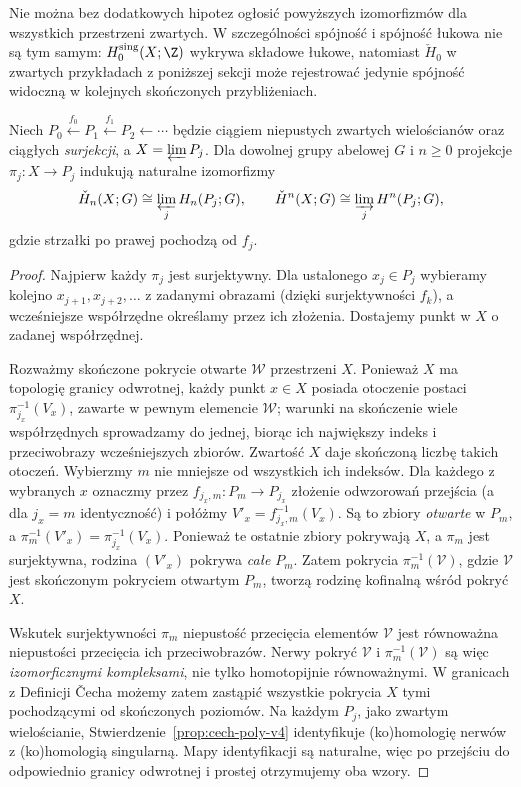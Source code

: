 \begin{uwaga}
Nie można bez dodatkowych hipotez ogłosić powyższych
izomorfizmów dla wszystkich przestrzeni zwartych.
W szczególności spójność i spójność łukowa nie są tym samym:
$H_0^{\mathrm{sing}}(X;\Z)$ wykrywa składowe łukowe,
natomiast $\check H_0$ w zwartych przykładach z poniższej
sekcji może rejestrować jedynie spójność widoczną w
kolejnych skończonych przybliżeniach.
\end{uwaga}

\begin{lemat}
\label{lem:cech-ciaglosc-odwrotna}
Niech $P_0\xleftarrow{f_0}P_1\xleftarrow{f_1}P_2
\xleftarrow{}\cdots$ będzie ciągiem niepustych
zwartych wielościanów oraz ciągłych \emph{surjekcji},
a $X=\varprojlim P_j$. Dla dowolnej grupy abelowej
$G$ i $n\ge0$ projekcje $\pi_j:X\to P_j$ indukują
naturalne izomorfizmy
\[
 \check H_n(X;G)\cong
 \varprojlim_j H_n(P_j;G),\qquad
 \check H^n(X;G)\cong
 \varinjlim_j H^n(P_j;G),
\]
gdzie strzałki po prawej pochodzą od $f_j$.
\end{lemat}
\begin{proof}
Najpierw każdy $\pi_j$ jest surjektywny.
Dla ustalonego $x_j\in P_j$ wybieramy kolejno
$x_{j+1},x_{j+2},\ldots$ z zadanymi obrazami
(dzięki surjektywności $f_k$), a wcześniejsze
współrzędne określamy przez ich złożenia.
Dostajemy punkt w $X$ o zadanej współrzędnej.

Rozważmy skończone pokrycie otwarte
$\mathcal W$ przestrzeni $X$. Ponieważ $X$
ma topologię granicy odwrotnej, każdy punkt
$x\in X$ posiada otoczenie postaci
$\pi_{j_x}^{-1}(V_x)$, zawarte w pewnym
elemencie $\mathcal W$; warunki na skończenie
wiele współrzędnych sprowadzamy do jednej,
biorąc ich największy indeks i przeciwobrazy
wcześniejszych zbiorów.
Zwartość $X$ daje skończoną liczbę takich otoczeń.
Wybierzmy $m$ nie mniejsze od wszystkich ich indeksów.
Dla każdego z wybranych $x$ oznaczmy przez
$f_{j_x,m}:P_m\to P_{j_x}$ złożenie odwzorowań
przejścia (a dla $j_x=m$ identyczność) i połóżmy
$V'_x=f_{j_x,m}^{-1}(V_x)$. Są to zbiory
\emph{otwarte} w $P_m$, a
$\pi_m^{-1}(V'_x)=\pi_{j_x}^{-1}(V_x)$.
Ponieważ te ostatnie zbiory pokrywają $X$,
a $\pi_m$ jest surjektywna, rodzina $(V'_x)$
pokrywa \emph{całe} $P_m$. Zatem pokrycia
$\pi_m^{-1}(\mathcal V)$, gdzie $\mathcal V$
jest skończonym pokryciem otwartym $P_m$,
tworzą rodzinę kofinalną wśród pokryć $X$.

Wskutek surjektywności $\pi_m$ niepustość
przecięcia elementów $\mathcal V$ jest równoważna
niepustości przecięcia ich przeciwobrazów.
Nerwy pokryć $\mathcal V$ i
$\pi_m^{-1}(\mathcal V)$ są więc
\emph{izomorficznymi kompleksami}, nie tylko
homotopijnie równoważnymi.
W granicach z Definicji \v{C}echa możemy zatem
zastąpić wszystkie pokrycia $X$ tymi
pochodzącymi od skończonych poziomów.
Na każdym $P_j$, jako zwartym wielościanie,
Stwierdzenie~\ref{prop:cech-poly-v4}
identyfikuje (ko)homologię nerwów
z (ko)homologią singularną.
Mapy identyfikacji są naturalne,
więc po przejściu do odpowiednio
granicy odwrotnej i prostej
otrzymujemy oba wzory.
\end{proof}

